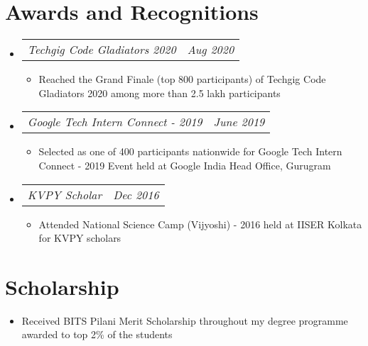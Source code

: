 \documentclass[res,10pt]{article}
\makeatletter
\newcommand{\resumeItem}[1]{
  \item\small{
    {#1 \vspace{-2pt}}
  }
}
\newcommand{\resumeSubSubheading}[2]{
    \item
    \begin{tabular*}{0.97\textwidth}{l@{\extracolsep{\fill}}r}
      \textit{\small#1} & \textit{\small #2} \\
    \end{tabular*}\vspace{-7pt}
}
\newcommand{\resumeSubHeadingListStart}{\begin{itemize}[leftmargin=0.15in, label={}]}
\newcommand{\resumeSubHeadingListEnd}{\end{itemize}}
\newcommand{\resumeItemListStart}{\begin{itemize}}
\newcommand{\resumeItemListEnd}{\end{itemize}\vspace{-5pt}}
\makeatother
\begin{document}
\section{Awards and Recognitions}
 \resumeSubHeadingListStart

    \resumeSubSubheading
      {Techgig Code Gladiators 2020}{Aug 2020}
      \resumeItemListStart
        \resumeItem{Reached the Grand Finale (top 800 participants) of Techgig Code Gladiators 2020 among more than 2.5 lakh participants}
      \resumeItemListEnd

    \resumeSubSubheading
      {Google Tech Intern Connect - 2019}{June 2019}
      \resumeItemListStart
        \resumeItem{Selected as one of 400 participants nationwide for Google Tech Intern Connect - 2019 Event held at Google India Head Office, Gurugram}
      \resumeItemListEnd
    
    \resumeSubSubheading
      {KVPY Scholar}{Dec 2016}
      \resumeItemListStart
        \resumeItem{Attended National Science Camp (Vijyoshi) - 2016 held at IISER Kolkata for KVPY scholars}
      \resumeItemListEnd
    
  \resumeSubHeadingListEnd

\section{Scholarship}
    \resumeItemListStart
    \resumeItem{Received BITS Pilani Merit Scholarship throughout my degree programme awarded to top 2\% of the students}
    \resumeItemListEnd
\end{document}
